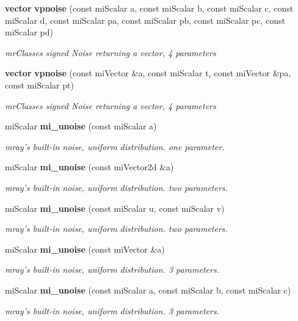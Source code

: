 \begin{CompactItemize}
{\bf vector} {\bf vpnoise} (const mi\-Scalar a, const mi\-Scalar b, const mi\-Scalar c, const mi\-Scalar d, const mi\-Scalar pa, const mi\-Scalar pb, const mi\-Scalar pc, const mi\-Scalar pd)
\begin{CompactList}\small\item\em mr\-Classes signed Noise returning a vector, 4 parameters \item\end{CompactList}\item 
{\bf vector} {\bf vpnoise} (const mi\-Vector \&a, const mi\-Scalar t, const mi\-Vector \&pa, const mi\-Scalar pt)
\begin{CompactList}\small\item\em mr\-Classes signed Noise returning a vector, 4 parameters \item\end{CompactList}\item 
mi\-Scalar {\bf mi\_\-unoise} (const mi\-Scalar a)
\begin{CompactList}\small\item\em mray's built-in noise, uniform distribution. one parameter. \item\end{CompactList}\item 
mi\-Scalar {\bf mi\_\-unoise} (const mi\-Vector2d \&a)
\begin{CompactList}\small\item\em mray's built-in noise, uniform distribution. two parameters. \item\end{CompactList}\item 
mi\-Scalar {\bf mi\_\-unoise} (const mi\-Scalar u, const mi\-Scalar v)
\begin{CompactList}\small\item\em mray's built-in noise, uniform distribution. two parameters. \item\end{CompactList}\item 
mi\-Scalar {\bf mi\_\-unoise} (const mi\-Vector \&a)
\begin{CompactList}\small\item\em mray's built-in noise, uniform distribution. 3 parameters. \item\end{CompactList}\item 
mi\-Scalar {\bf mi\_\-unoise} (const mi\-Scalar a, const mi\-Scalar b, const mi\-Scalar c)
\begin{CompactList}\small\item\em mray's built-in noise, uniform distribution. 3 parameters. \item\end{CompactList}\item 

\end{CompactItemize}
